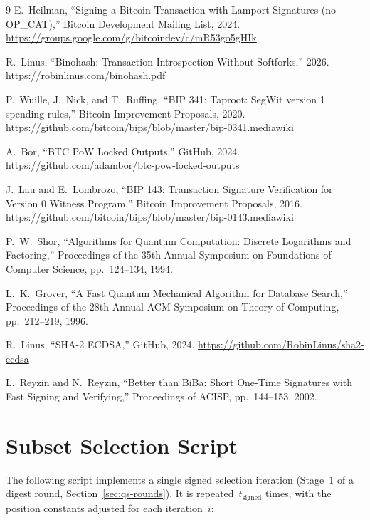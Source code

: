 \documentclass[11pt, a4paper]{article}
\begin{document}
\begin{thebibliography}{9}
    E.~Heilman,
    ``Signing a Bitcoin Transaction with Lamport Signatures (no OP\_CAT),''
    Bitcoin Development Mailing List, 2024.
    \url{https://groups.google.com/g/bitcoindev/c/mR53go5gHIk}

    R.~Linus,
    ``Binohash: Transaction Introspection Without Softforks,''
    2026.
    \url{https://robinlinus.com/binohash.pdf}

    P.~Wuille, J.~Nick, and T.~Ruffing,
    ``BIP 341: Taproot: SegWit version 1 spending rules,''
    Bitcoin Improvement Proposals, 2020.
    \url{https://github.com/bitcoin/bips/blob/master/bip-0341.mediawiki}

    A.~Bor,
    ``BTC PoW Locked Outputs,''
    GitHub, 2024.
    \url{https://github.com/adambor/btc-pow-locked-outputs}

    J.~Lau and E.~Lombrozo,
    ``BIP 143: Transaction Signature Verification for Version 0 Witness Program,''
    Bitcoin Improvement Proposals, 2016.
    \url{https://github.com/bitcoin/bips/blob/master/bip-0143.mediawiki}

    P.~W.~Shor,
    ``Algorithms for Quantum Computation: Discrete Logarithms and Factoring,''
    Proceedings of the 35th Annual Symposium on Foundations of Computer Science, pp.~124--134, 1994.

    L.~K.~Grover,
    ``A Fast Quantum Mechanical Algorithm for Database Search,''
    Proceedings of the 28th Annual ACM Symposium on Theory of Computing, pp.~212--219, 1996.

    R.~Linus,
    ``SHA-2 ECDSA,''
    GitHub, 2024.
    \url{https://github.com/RobinLinus/sha2-ecdsa}

    L.~Reyzin and N.~Reyzin,
    ``Better than BiBa: Short One-Time Signatures with Fast Signing and Verifying,''
    Proceedings of ACISP, pp.~144--153, 2002.
\end{thebibliography}

\appendix

\section{Subset Selection Script}
\label{app:selection-script}

The following script implements a single signed selection iteration (Stage~1 of a digest round, Section~\ref{sec:qs-rounds}). It is repeated~$t_{\mathrm{signed}}$ times, with the position constants adjusted for each iteration~$i$:
\end{document}
